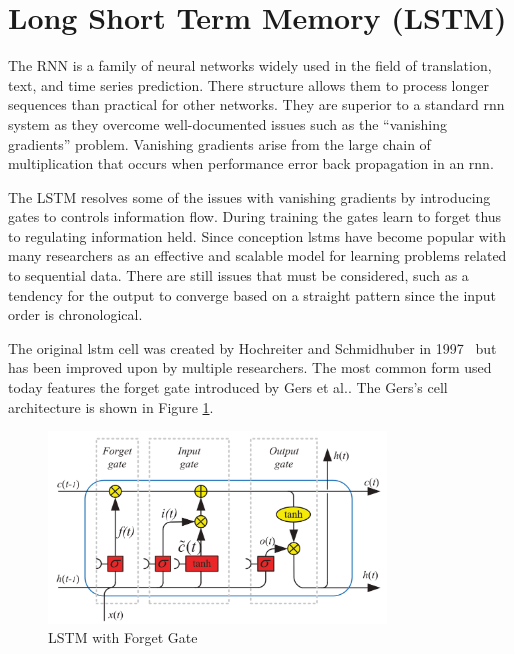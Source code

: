 \section{Long Short Term Memory (LSTM)}
The RNN is a family of neural networks widely used in the field of translation, text, and time series prediction. There structure allows them to process longer sequences than practical for other networks.\cite{Goodfellow2015} They are superior to a standard \acrshort{rnn} system as they overcome well-documented issues such as the ``vanishing gradients'' problem. Vanishing gradients arise from the large chain of multiplication that occurs when performance error back propagation in an \acrshort{rnn}.\cite{Sherstinsky2020, Lee2021}


The LSTM resolves some of the issues with vanishing gradients by introducing gates to controls information flow\cite{Hochreiter1997}. During training the gates learn to forget thus to regulating information held\cite{Hernandez2021}. Since conception \acrshort{lstm}s have become popular with many researchers as an effective and scalable model for learning problems related to sequential data.\cite{Greff2017, Yu2019} There are still issues that must be considered, such as a tendency for the output to converge based on a straight pattern since the input order is chronological.\cite{Lee2021}

The original \acrshort{lstm} cell was created by Hochreiter and Schmidhuber in 1997~\cite{Hochreiter1997} but has been improved upon by multiple researchers. The most common form used today features the forget gate introduced by Gers et al.\cite{Gers2000, Yu2019}. The Gers's cell architecture is shown in Figure \ref{fig:bck-lst-architecture}.

\begin{figure}[!htb]
    \centering
    \includegraphics[width=0.8\textwidth]{content/2-Background/lstm_with_forget_gait.png}
    \caption[LSTM with Forget Gate]{LSTM with Forget Gate\cite{Yu2019}}
    \label{fig:bck-lst-architecture}
\end{figure}

